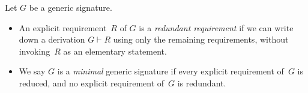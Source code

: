 \documentclass[../generics]{subfiles}
\begin{document}
\begin{definition}\label{minimal generic sig def} Let $G$ be a generic signature.
\begin{itemize}
\item An explicit requirement~$R$ of $G$ is a \emph{redundant requirement} if we can write down a derivation $G\vdash R$ using only the remaining requirements, without invoking~$R$ as an elementary statement.
\item We say $G$ is a \emph{minimal} generic signature if every explicit requirement of~$G$ is reduced, and no explicit requirement of~$G$ is redundant.
\end{itemize}
\end{definition}
\end{document}
